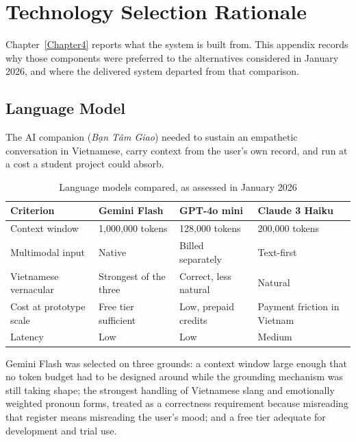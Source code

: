 \chapter{Technology Selection Rationale}
\label{Appendix5}

Chapter~\ref{Chapter4} reports what the system is built from. This appendix records why those components were preferred to the alternatives considered in January 2026, and where the delivered system departed from that comparison.

\section{Language Model}

The AI companion (\textit{Bạn Tâm Giao}) needed to sustain an empathetic conversation in Vietnamese, carry context from the user's own record, and run at a cost a student project could absorb.

\begin{table}[htbp]
  \centering
  \small
  \caption{Language models compared, as assessed in January 2026}
  \label{tab:llm-comparison}
  \begin{tabular}{|L{3.1cm}|L{3.3cm}|L{3.3cm}|L{3.6cm}|}
    \hline
    \textbf{Criterion} & \textbf{Gemini Flash} & \textbf{GPT-4o mini} & \textbf{Claude 3 Haiku} \\
    \hline
    Context window & 1,000,000 tokens & 128,000 tokens & 200,000 tokens \\
    \hline
    Multimodal input & Native & Billed separately & Text-first \\
    \hline
    Vietnamese vernacular & Strongest of the three & Correct, less natural & Natural \\
    \hline
    Cost at prototype scale & Free tier sufficient & Low, prepaid credits & Payment friction in Vietnam \\
    \hline
    Latency & Low & Low & Medium \\
    \hline
  \end{tabular}
\end{table}

Gemini Flash was selected on three grounds: a context window large enough that no token budget had to be designed around while the grounding mechanism was still taking shape; the strongest handling of Vietnamese slang and emotionally weighted pronoun forms, treated as a correctness requirement because misreading that register means misreading the user's mood; and a free tier adequate for development and trial use.

